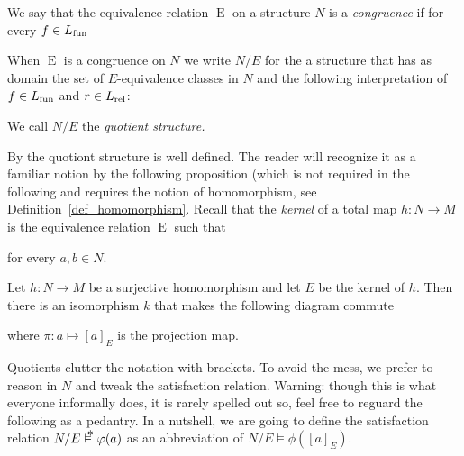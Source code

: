 \begin{definition}\label{def_congruence}
We say that the equivalence relation $\mathrel{E}$ on a structure $N$ is a \emph{congruence\/} if for every $f\in L_{\rm fun}$


When $\mathrel{E}$ is a congruence on $N$ we write \emph{$N/E$\/} for the a structure that has as domain the set of $E$-equivalence classes in $N$ and the following interpretation of $f\in L_{\rm fun}$ and $r\in L_{\rm rel}$:



We call $N/E$ the \emph{quotient structure.}
\end{definition}

By  the quotiont structure is well defined.
The reader will recognize it as a familiar notion by the following proposition (which is not required in the following and requires the notion of homomorphism, see Definition~\ref{def_homomorphism}.
Recall that the \emph{kernel\/} of a total map $h:N\to M$ is the equivalence relation $\mathrel{E}$ such that


for every $a,b\in N$.

\begin{proposition}
Let $h:N\to M$ be a surjective homomorphism and let $E$ be the kernel of $h$.
Then there is an isomorphism $k$ that makes the following diagram commute

\hspace*{25ex}

where $\pi:a\mapsto [a]_E$ is the projection map.
\end{proposition}

\noindent\llap{\textcolor{red}{\Large\warning}\kern1.5ex}%
Quotients clutter the notation with brackets.
To avoid the mess, we prefer to reason in $N$ and tweak the satisfaction relation.
Warning: though this is what everyone informally does, it is rarely spelled out so, feel free to reguard the following as a pedantry.
In a nutshell, we are going to define the satisfaction relation $N/E\pmodels\phi(a)$ as an abbreviation of $N/E\models\phi([a]_E)$.

